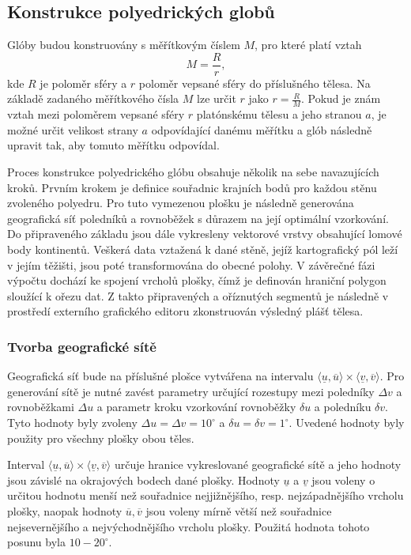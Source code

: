 \documentclass[12pt]{article}
\begin{document}
{\subsection {Konstrukce polyedrických globů}}
Glóby budou konstruovány s měřítkovým číslem $M$, pro které platí vztah
\[
    M = \frac{R}{r},
\]
kde $R$ je poloměr sféry a $r$ poloměr vepsané sféry do příslušného tělesa. Na základě zadaného měřítkového čísla $M$ lze určit $r$ jako $r = \frac{R}{M}$. Pokud je znám vztah mezi poloměrem vepsané sféry $r$ platónskému tělesu a jeho stranou $a$, je možné určit velikost strany $a$ odpovídající danému měřítku a glób následně upravit tak, aby tomuto měřítku odpovídal.

Proces konstrukce polyedrického glóbu obsahuje několik na sebe navazujících kroků. Prvním krokem je definice souřadnic krajních bodů pro každou stěnu zvoleného polyedru. Pro tuto vymezenou plošku je následně generována geografická síť poledníků a rovnoběžek s důrazem na její optimální vzorkování. Do připraveného základu jsou dále vykresleny vektorové vrstvy obsahující lomové body kontinentů. Veškerá data vztažená k dané stěně, jejíž kartografický pól leží v jejím těžišti, jsou poté transformována do obecné polohy. V závěrečné fázi výpočtu dochází ke spojení vrcholů plošky, čímž je definován hraniční polygon sloužící k ořezu dat. Z takto připravených a oříznutých segmentů je následně v prostředí externího grafického editoru zkonstruován výsledný plášť tělesa.
        
{\subsubsection {Tvorba geografické sítě}} 
Geografická síť bude na příslušné plošce vytvářena na intervalu $\langle \underline{u}, \overline{u} \rangle \times \langle \underline{v}, \overline{v} \rangle$. Pro generování sítě je nutné zavést parametry určující rozestupy mezi poledníky $\Delta v$ a rovnoběžkami $\Delta u$ a parametr kroku vzorkování rovnoběžky $\delta u$ a poledníku $\delta v$. Tyto hodnoty byly zvoleny $\Delta u = \Delta v = 10^\circ$ a $\delta u = \delta v = 1^\circ$. Uvedené hodnoty byly použity pro všechny plošky obou těles.

Interval $\langle \underline{u}, \overline{u} \rangle \times \langle \underline{v}, \overline{v} \rangle$ určuje hranice vykreslované geografické sítě a jeho hodnoty jsou závislé na okrajových bodech dané plošky. Hodnoty $\underline{u}$ a $\underline{v}$ jsou voleny o určitou hodnotu menší než souřadnice nejjižnějšího, resp. nejzápadnějšího vrcholu plošky, naopak hodnoty $\overline{u}, \overline{v}$ jsou voleny mírně větší než souřadnice nejsevernějšího a nejvýchodnějšího vrcholu plošky. Použitá hodnota tohoto posunu byla $10 - 20^\circ$.
\end{document}
